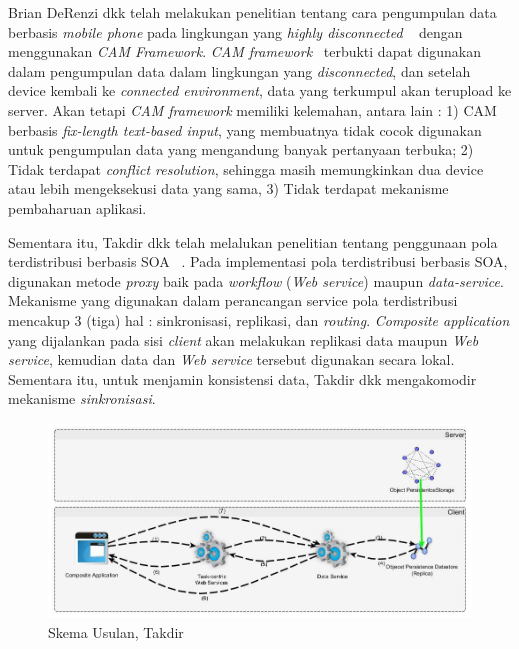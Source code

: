 Brian DeRenzi dkk telah melakukan penelitian tentang cara pengumpulan data berbasis \textit{mobile phone} pada lingkungan yang \textit{highly disconnected} ~\cite{derenzi_reliable_2007} dengan menggunakan \textit{CAM Framework}. \textit{CAM framework}~\cite{parikh_designing_2006} terbukti dapat digunakan dalam pengumpulan data dalam lingkungan yang \textit{disconnected}, dan setelah device kembali ke \textit{connected environment}, data yang terkumpul akan terupload ke server. Akan tetapi \textit{CAM framework} memiliki kelemahan, antara lain : 1) CAM berbasis \textit{fix-length text-based input}, yang membuatnya tidak cocok digunakan untuk pengumpulan data yang mengandung banyak pertanyaan terbuka; 2) Tidak terdapat \textit{conflict resolution}, sehingga masih memungkinkan dua device atau lebih mengeksekusi data yang sama, 3) Tidak terdapat mekanisme pembaharuan aplikasi.

Sementara itu, Takdir dkk telah melalukan penelitian tentang penggunaan pola terdistribusi berbasis SOA ~\cite{takdir_multi-layer_2014}. Pada implementasi pola terdistribusi berbasis SOA, digunakan metode \textit{proxy} baik pada \textit{workflow} (\textit{Web service}) maupun \textit{data-service}. Mekanisme yang digunakan dalam perancangan service pola terdistribusi mencakup 3 (tiga) hal : sinkronisasi, replikasi, dan \textit{routing}. \textit{Composite application} yang dijalankan pada sisi \textit{client} akan melakukan replikasi data maupun \textit{Web service}, kemudian data dan \textit{Web service} tersebut digunakan secara lokal. Sementara itu, untuk menjamin konsistensi data, Takdir dkk mengakomodir mekanisme \textit{sinkronisasi}.

\begin{figure}[h]
    \centering
    \includegraphics[width=13cm]{../../Resources/Images/takdir-deployment-3a}
    \caption{Skema Usulan, Takdir}
    \label{fig:takdir-soa}
\end{figure}

